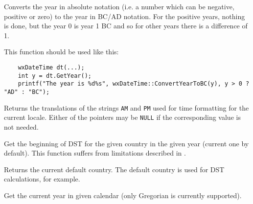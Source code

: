 Converts the year in absolute notation (i.e. a number which can be negative,
positive or zero) to the year in BC/AD notation. For the positive years,
nothing is done, but the year 0 is year 1 BC and so for other years there is a
difference of 1.

This function should be used like this:

\begin{verbatim}
    wxDateTime dt(...);
    int y = dt.GetYear();
    printf("The year is %d%s", wxDateTime::ConvertYearToBC(y), y > 0 ? "AD" : "BC");
\end{verbatim}


\label{wxdatetimegetampmstrings}


Returns the translations of the strings {\tt AM} and {\tt PM} used for time
formatting for the current locale. Either of the pointers may be {\tt NULL} if
the corresponding value is not needed.


\label{wxdatetimegetbegindst}


Get the beginning of DST for the given country in the given year (current one
by default). This function suffers from limitations described in
.




\label{wxdatetimegetcountry}


Returns the current default country. The default country is used for DST
calculations, for example.




\label{wxdatetimegetcurrentyear}


Get the current year in given calendar (only Gregorian is currently supported).


\label{wxdatetimegetcurrentmonth}

